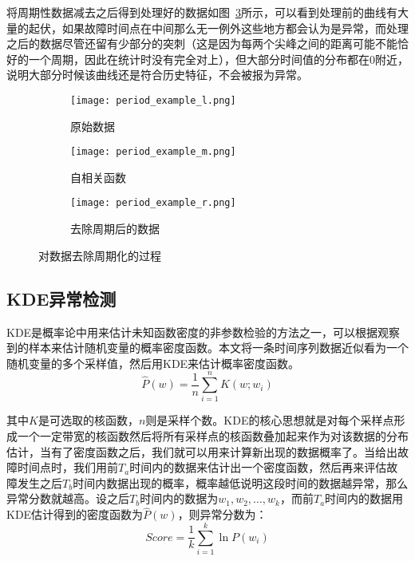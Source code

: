 将周期性数据减去之后得到处理好的数据如图~\ref{fig:period:right}所示，可以看到处理前的曲线有大量的起伏，如果故障时间点在中间那么无一例外这些地方都会认为是异常，而处理之后的数据尽管还留有少部分的突刺（这是因为每两个尖峰之间的距离可能不能恰好的一个周期，因此在统计时没有完全对上），但大部分时间值的分布都在0附近，说明大部分时候该曲线还是符合历史特征，不会被报为异常。
\begin{figure}[htbp]
  \begin{subfigure}[b]{0.335\textwidth}
    \begin{minipage}[t]{\linewidth}
    \centering
    \texttt{[image: period\_example\_l.png]}
    \caption{原始数据}
    \label{fig:period:left}
    \end{minipage}
  \end{subfigure}
  \begin{subfigure}[b]{0.325\textwidth}
    \begin{minipage}[t]{\linewidth}
    \centering
    \texttt{[image: period\_example\_m.png]}
    \caption{自相关函数}
    \label{fig:period:middle}
    \end{minipage}
  \end{subfigure}
  \begin{subfigure}[b]{0.325\textwidth}
    \begin{minipage}[t]{\linewidth}
      \centering
      \texttt{[image: period\_example\_r.png]}
      \caption{去除周期后的数据}
      \label{fig:period:right}
      \end{minipage}
    \end{subfigure}
    \caption{对数据去除周期化的过程}
    \label{fig:period}
\end{figure}
\subsection{KDE异常检测}
KDE是概率论中用来估计未知函数密度的非参数检验的方法之一，可以根据观察到的样本来估计随机变量的概率密度函数。本文将一条时间序列数据近似看为一个随机变量的多个采样值，然后用KDE来估计概率密度函数。
\begin{equation*}
\hat{P}(w) = \frac{1}{n}\sum_{i=1}^nK(w;w_i)
\end{equation*}

其中$K$是可选取的核函数，$n$则是采样个数。KDE的核心思想就是对每个采样点形成一个一定带宽的核函数然后将所有采样点的核函数叠加起来作为对该数据的分布估计，当有了密度函数之后，我们就可以用来计算新出现的数据概率了。当给出故障时间点时，我们用前$T_a$时间内的数据来估计出一个密度函数，然后再来评估故障发生之后$T_b$时间内数据出现的概率，概率越低说明这段时间的数据越异常，那么异常分数就越高。设之后$T_b$时间内的数据为$w_1,w_2,\dots,w_k$，而前$T_a$时间内的数据用KDE估计得到的密度函数为$\hat{P}(w)$，则异常分数为：
\begin{equation*}
  Score = \frac{1}{k}\sum_{i=1}^k\ln P(w_i)
\end{equation*}

